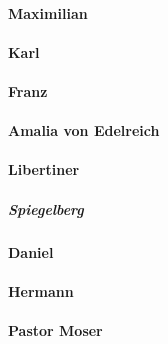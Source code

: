 \paragraph{Maximilian}
\paragraph{Karl}
\paragraph{Franz}
\paragraph{Amalia von Edelreich}
\paragraph{Libertiner}
\subparagraph{Spiegelberg}
\paragraph{Daniel}
\paragraph{Hermann}
\paragraph{Pastor Moser}	